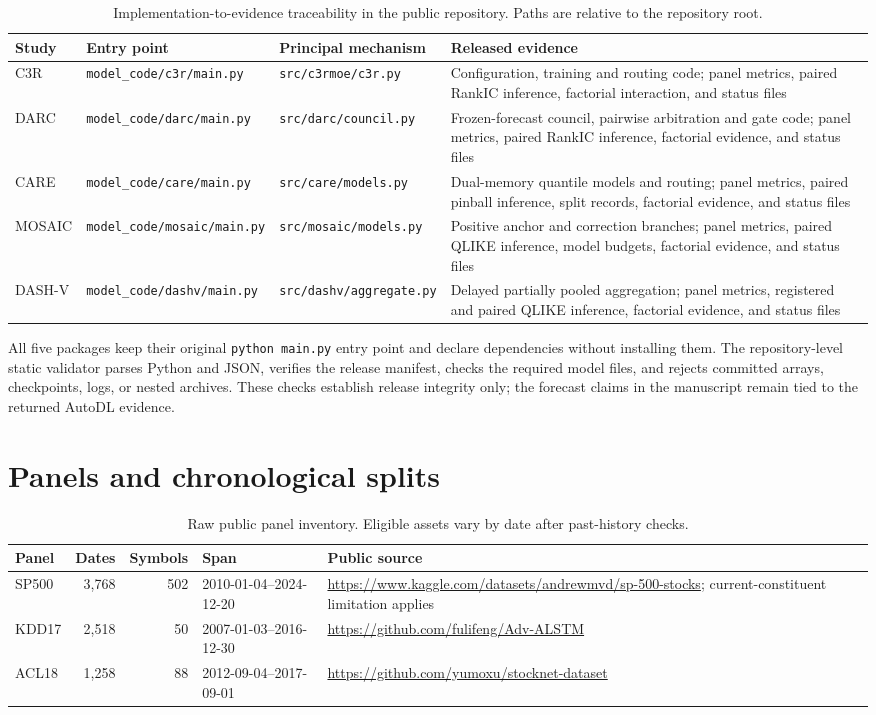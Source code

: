 \documentclass[10pt]{article}
\begin{document}
\begin{table}[H]
\centering
\scriptsize
\caption{Implementation-to-evidence traceability in the public repository. Paths are relative to the repository root.}
\label{tab:code-map}
\begin{tabular}{p{1.15cm}p{3.05cm}p{4.1cm}p{5.7cm}}
\toprule
Study & Entry point & Principal mechanism & Released evidence \tabularnewline
\midrule
C3R & \texttt{model\_code/c3r/main.py} & \texttt{src/c3rmoe/c3r.py} & Configuration, training and routing code; panel metrics, paired RankIC inference, factorial interaction, and status files \tabularnewline
DARC & \texttt{model\_code/darc/main.py} & \texttt{src/darc/council.py} & Frozen-forecast council, pairwise arbitration and gate code; panel metrics, paired RankIC inference, factorial evidence, and status files \tabularnewline
CARE & \texttt{model\_code/care/main.py} & \texttt{src/care/models.py} & Dual-memory quantile models and routing; panel metrics, paired pinball inference, split records, factorial evidence, and status files \tabularnewline
MOSAIC & \texttt{model\_code/mosaic/main.py} & \texttt{src/mosaic/models.py} & Positive anchor and correction branches; panel metrics, paired QLIKE inference, model budgets, factorial evidence, and status files \tabularnewline
DASH-V & \texttt{model\_code/dashv/main.py} & \texttt{src/dashv/aggregate.py} & Delayed partially pooled aggregation; panel metrics, registered and paired QLIKE inference, factorial evidence, and status files \tabularnewline
\bottomrule
\end{tabular}
\end{table}

All five packages keep their original \texttt{python main.py} entry point and
declare dependencies without installing them. The repository-level static
validator parses Python and JSON, verifies the release manifest, checks the
required model files, and rejects committed arrays, checkpoints, logs, or nested
archives. These checks establish release integrity only; the forecast claims in
the manuscript remain tied to the returned AutoDL evidence.

\section{Panels and chronological splits}

\begin{table}[H]\centering\small
\caption{Raw public panel inventory. Eligible assets vary by date after past-history checks.}
\begin{tabular}{lrrlp{5.3cm}}
\toprule
Panel & Dates & Symbols & Span & Public source \\
\midrule
SP500 & 3,768 & 502 & 2010-01-04--2024-12-20 & \url{https://www.kaggle.com/datasets/andrewmvd/sp-500-stocks}; current-constituent limitation applies \\
KDD17 & 2,518 & 50 & 2007-01-03--2016-12-30 & \url{https://github.com/fulifeng/Adv-ALSTM} \\
ACL18 & 1,258 & 88 & 2012-09-04--2017-09-01 & \url{https://github.com/yumoxu/stocknet-dataset} \\
\bottomrule
\end{tabular}
\end{table}
\end{document}
